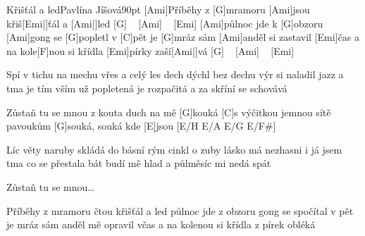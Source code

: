 \begin{song}{Křišťál a led}{Pavlína Jíšová}{90pt}
%
[Ami]Příběhy z [G]mramoru [Ami]jsou křiš[Emi|]{ťál a} [Ami|]{led} [G] ~ [Ami] ~ [Emi]{}
[Ami]půlnoc jde k [G]obzoru [Ami]gong se [G]popletl v [C]pět
je [G]mráz sám [Ami]anděl si zastavil [Emi]{čas}
a na kole[F]nou si křídla [Emi]pírky zaší[Ami|]{vá} [G] ~ [Ami] ~ [Emi]{}

%
Spí v tichu na mechu vřes a celý les
dech dýchl bez dechu výr si naladil jazz
a tma je tím vším už popletená
je rozpačitá a za skříní se schovává

\chorus%
[C]Zůstaň tu se mnou z kouta duch na mě [G]kouká
[C]s výčitkou jemnou sítě pavoukům [G]souká, souká
kde [E]jsou [E/H E/A E/G E/F#]{}

%
Líc věty naruby skládá do básní
rým cinkl o zuby lásko má nezhasni
i já jsem tma co se přestala bát
budí mě hlad a půlměsíc mi nedá spát

\chorus%
Zůstaň tu se mnou\dots

%
Příběhy z mramoru čtou křišťál a led
půlnoc jde z obzoru gong se spočítal v pět
je mráz sám anděl mě opravil včas
a na kolenou si křídla z pírek obléká
\end{song}
